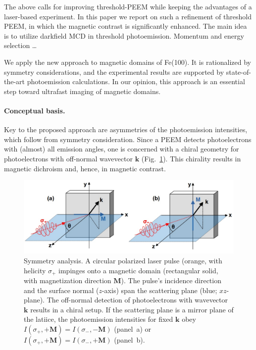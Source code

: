 \documentclass[prl,twocolumn,floatfix]{revtex4-2}
\renewcommand{\vec}[1]{\boldsymbol{#1}}
\begin{document}
The above calls for improving threshold-PEEM while keeping the advantages of a laser-based experiment. In this paper we report on such a refinement of threshold PEEM, in which the magnetic contrast is significantly enhanced. The main idea is to utilize darkfield MCD in threshold photoemission. Momentum and energy selection \ldots 

We apply the new approach to magnetic domains of Fe(100). It is rationalized by symmetry considerations, and the experimental results are supported by state-of-the-art photoemission calculations. In our opinion, this approach is an essential step toward ultrafast imaging of magnetic domains.

\paragraph{Conceptual basis.} Key to the proposed approach are asymmetries of the photoemission intensities, which follow from  symmetry consideration. Since a PEEM detects photoelectrons with (almost) all emission angles, one is concerned with a chiral geometry for photoelectrons with off-normal wavevector $\vec{k}$ (Fig.~\ref{fig:symmetry}). This chirality results in magnetic dichroism and, hence, in magnetic contrast.

\begin{figure}
    \centering
    \includegraphics[width = \columnwidth]{symmetry}
    \caption{Symmetry analysis. A circular polarized laser pulse (orange, with helicity $\sigma_{+}$ impinges onto a magnetic domain (rectangular solid, with magnetization direction $\vec{M}$). The pulse's incidence direction and the surface normal ($z$-axis) span the scattering plane (blue; $xz$-plane). The off-normal detection of photoelectrons with wavevector $\vec{k}$ results in a chiral setup. If the scattering plane is a mirror plane of the latiice, the photoemission intensities for fixed $\vec{k}$ obey $I(\sigma_{+}, +\vec{M}) = I(\sigma_{-}, -\vec{M})$ (panel~a) or $I(\sigma_{+}, +\vec{M}) = I(\sigma_{-}, +\vec{M})$ (panel~b).}
    \label{fig:symmetry}
\end{figure}
\end{document}
